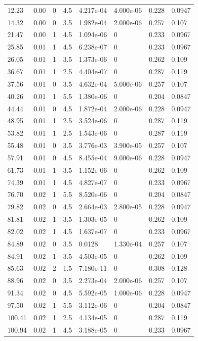 \documentclass[preview]{standalone}
\begin{document}
{{\begin{tabular}{L{1.2cm}C{1.2cm} C{0.3cm}C{0.5cm} C{1.4cm}C{1.4cm} C{1.4cm}C{1.4cm}}
  12.23  &  0.00  & 0     & 4.5 &  4.217e-04  & 4.000e-06  & 0.228 &  0.0947   \\ 
  14.32  &  0.00  & 0     & 3.5 &  1.982e-04  & 2.000e-06  & 0.257 &  0.107   \\ 
  21.47  &  0.00  & 1     & 4.5 &  1.094e-06  & 0  & 0.233 &  0.0967   \\ 
  25.85  &  0.01  & 1     & 4.5 &  6.238e-07  & 0  & 0.233 &  0.0967   \\ 
  26.05  &  0.01  & 1     & 3.5 &  1.373e-06  & 0  & 0.262 &  0.109   \\ 
  36.67  &  0.01  & 1     & 2.5 &  4.404e-07  & 0  & 0.287 &  0.119   \\ 
  37.56  &  0.01  & 0     & 3.5 &  4.632e-04  & 5.000e-06  & 0.257 &  0.107   \\ 
  40.26  &  0.01  & 1     & 5.5 &  1.380e-06  & 0  & 0.204 &  0.0847   \\ 
  44.44  &  0.01  & 0     & 4.5 &  1.872e-04  & 2.000e-06  & 0.228 &  0.0947   \\ 
  48.95  &  0.01  & 1     & 2.5 &  3.524e-06  & 0  & 0.287 &  0.119   \\ 
  53.82  &  0.01  & 1     & 2.5 &  1.543e-06  & 0  & 0.287 &  0.119   \\ 
  55.48  &  0.01  & 0     & 3.5 &  3.776e-03  & 3.900e-05  & 0.257 &  0.107   \\ 
  57.91  &  0.01  & 0     & 4.5 &  8.455e-04  & 9.000e-06  & 0.228 &  0.0947   \\ 
  61.73  &  0.01  & 1     & 3.5 &  1.152e-06  & 0  & 0.262 &  0.109   \\ 
  74.39  &  0.01  & 1     & 4.5 &  4.827e-07  & 0  & 0.233 &  0.0967   \\ 
  76.70  &  0.02  & 1     & 5.5 &  8.520e-06  & 0  & 0.204 &  0.0847   \\ 
  79.82  &  0.02  & 0     & 4.5 &  2.664e-03  & 2.800e-05  & 0.228 &  0.0947   \\ 
  81.81  &  0.02  & 1     & 3.5 &  1.303e-05  & 0  & 0.262 &  0.109   \\ 
  82.02  &  0.02  & 1     & 4.5 &  1.637e-07  & 0  & 0.233 &  0.0967   \\ 
  84.89  &  0.02  & 0     & 3.5 &  0.0128  & 1.330e-04  & 0.257 &  0.107   \\ 
  84.91  &  0.02  & 1     & 3.5 &  4.503e-05  & 0  & 0.262 &  0.109   \\ 
  85.63  &  0.02  & 2     & 1.5 &  7.180e-11  & 0  & 0.308 &  0.128   \\ 
  88.96  &  0.02  & 0     & 3.5 &  2.273e-04  & 2.000e-06  & 0.257 &  0.107   \\ 
  91.34  &  0.02  & 0     & 4.5 &  5.592e-05  & 1.000e-06  & 0.228 &  0.0947   \\ 
  97.50  &  0.02  & 1     & 5.5 &  3.112e-06  & 0  & 0.204 &  0.0847   \\ 
  100.41  &  0.02  & 1     & 2.5 &  4.134e-05  & 0  & 0.287 &  0.119   \\ 
  100.94  &  0.02  & 1     & 4.5 &  3.188e-05  & 0  & 0.233 &  0.0967   \\ 
\hline 
\end{tabular} 

}}
\end{document}
